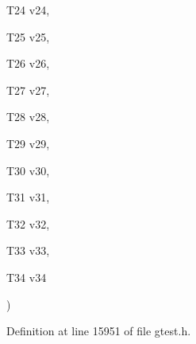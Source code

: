 {{\begin{DoxyParamCaption}
\item[{\-T24}]{v24, }
\item[{\-T25}]{v25, }
\item[{\-T26}]{v26, }
\item[{\-T27}]{v27, }
\item[{\-T28}]{v28, }
\item[{\-T29}]{v29, }
\item[{\-T30}]{v30, }
\item[{\-T31}]{v31, }
\item[{\-T32}]{v32, }
\item[{\-T33}]{v33, }
\item[{\-T34}]{v34}
\end{DoxyParamCaption}
)}}\label{d0/d75/namespacetesting_a37ae9a0b15ed1e02fda22769ef76c97e}


\-Definition at line 15951 of file gtest.\-h.



